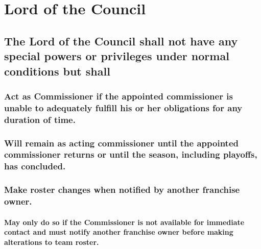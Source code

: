 \documentclass[]{book}
\let\oldparagraph\paragraph
\renewcommand{\paragraph}[1]{\oldparagraph{#1}\mbox{}}
\begin{document}
\hypertarget{lord-of-the-council}{%
\section{Lord of the Council}\label{lord-of-the-council}}

\hypertarget{the-lord-of-the-council-shall-not-have-any-special-powers-or-privileges-under-normal-conditions-but-shall}{%
\subsection{The Lord of the Council shall not have any special powers or privileges under normal conditions but shall}\label{the-lord-of-the-council-shall-not-have-any-special-powers-or-privileges-under-normal-conditions-but-shall}}

\hypertarget{act-as-commissioner-if-the-appointed-commissioner-is-unable-to-adequately-fulfill-his-or-her-obligations-for-any-duration-of-time.}{%
\subsubsection{Act as Commissioner if the appointed commissioner is unable to adequately fulfill his or her obligations for any duration of time.}\label{act-as-commissioner-if-the-appointed-commissioner-is-unable-to-adequately-fulfill-his-or-her-obligations-for-any-duration-of-time.}}

\hypertarget{will-remain-as-acting-commissioner-until-the-appointed-commissioner-returns-or-until-the-season-including-playoffs-has-concluded.}{%
\subsubsection{Will remain as acting commissioner until the appointed commissioner returns or until the season, including playoffs, has concluded.}\label{will-remain-as-acting-commissioner-until-the-appointed-commissioner-returns-or-until-the-season-including-playoffs-has-concluded.}}

\hypertarget{make-roster-changes-when-notified-by-another-franchise-owner.}{%
\subsubsection{Make roster changes when notified by another franchise owner.}\label{make-roster-changes-when-notified-by-another-franchise-owner.}}

\hypertarget{may-only-do-so-if-the-commissioner-is-not-available-for-immediate-contact-and-must-notify-another-franchise-owner-before-making-alterations-to-team-roster.}{%
\paragraph{May only do so if the Commissioner is not available for immediate contact and must notify another franchise owner before making alterations to team roster.}\label{may-only-do-so-if-the-commissioner-is-not-available-for-immediate-contact-and-must-notify-another-franchise-owner-before-making-alterations-to-team-roster.}}
\end{document}
